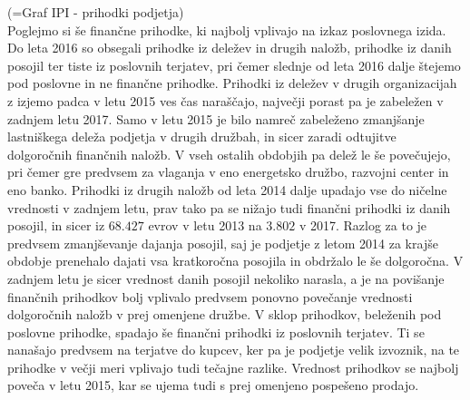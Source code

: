\documentclass[12pt,a4paper]{amsart}
\theoremstyle{definition} %
\theoremstyle{plain} %
\begin{document}
(=Graf IPI - prihodki podjetja)\\
Poglejmo si še finančne prihodke, ki najbolj vplivajo na izkaz poslovnega izida. Do leta 2016 so obsegali prihodke iz deležev in drugih naložb, prihodke iz danih posojil ter tiste iz poslovnih terjatev, pri čemer slednje od leta 2016 dalje štejemo pod poslovne in ne finančne prihodke. Prihodki iz deležev v drugih organizacijah z izjemo padca v letu 2015 ves čas naraščajo, največji porast pa je zabeležen v zadnjem letu 2017. Samo v letu 2015 je bilo namreč zabeleženo zmanjšanje lastniškega deleža podjetja v drugih družbah, in sicer zaradi odtujitve dolgoročnih finančnih naložb. V vseh ostalih obdobjih pa delež le še povečujejo, pri čemer gre predvsem za vlaganja v eno energetsko družbo, razvojni center in eno banko. Prihodki iz drugih naložb od leta 2014 dalje upadajo vse do ničelne vrednosti v zadnjem letu, prav tako pa se nižajo tudi finančni prihodki iz danih posojil, in sicer iz $68.427$ evrov v letu 2013 na $3.802$ v 2017. Razlog za to je predvsem zmanjševanje dajanja posojil, saj je podjetje z letom 2014 za krajše obdobje prenehalo dajati vsa kratkoročna posojila in obdržalo le še dolgoročna. V zadnjem letu je sicer vrednost danih posojil nekoliko narasla, a je na povišanje finančnih prihodkov bolj vplivalo predvsem ponovno povečanje vrednosti dolgoročnih naložb v prej omenjene družbe. V sklop prihodkov, beleženih pod poslovne prihodke, spadajo še finančni prihodki iz poslovnih terjatev. Ti se nanašajo predvsem na terjatve do kupcev, ker pa je podjetje velik izvoznik, na te prihodke v večji meri vplivajo tudi tečajne razlike. Vrednost prihodkov se najbolj poveča v letu 2015, kar se ujema tudi s prej omenjeno pospešeno prodajo.\par
\end{document}
